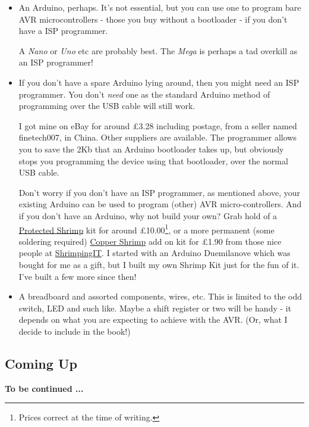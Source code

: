 \begin{itemize}
\item
  An Arduino, perhaps. It's not essential, but you can use one to program bare AVR microcontrollers - those you buy without a bootloader -   if you don't have a ISP programmer.
  
  A \emph{Nano} or \emph{Uno} etc are probably best. The \emph{Mega} is perhaps a tad overkill as an ISP programmer!
\item
  If you don't have a spare Arduino lying around, then you might need an ISP programmer. You don't \emph{need} one as the standard Arduino method of programming over the USB cable will still work.
  
  I got mine on eBay for around £3.28 including postage, from a seller named finetech007, in China. Other suppliers are available. The programmer allows you to save the 2Kb that an Arduino bootloader takes up, but obviously stops you programming the device using that bootloader, over the normal USB cable.

  Don't worry if you don't have an ISP programmer, as mentioned above, your existing Arduino can be used to program (other) AVR   micro-controllers. And if you don't have an Arduino, why not build your own? Grab hold of a \href{http://start.shrimping.it/project/protected/build.html}{Protected Shrimp} kit for around £10.00\footnote{Prices correct at the time of writing.}, or a more permanent (some soldering required) \href{http://start.shrimping.it/kit/stripboard.html}{Copper Shrimp} add on kit for £1.90 from those nice people at \href{http://start.shrimping.it//index.html}{ShrimpingIT}. I started with an Arduino Duemilanove which was bought for me as a gift, but I built my own Shrimp Kit just for the fun of it. I've built a few more since then!
\item
  A breadboard and assorted components, wires, etc. This is limited to the odd switch, LED and such like. Maybe a shift register or two will be handy - it depends on what you are expecting to achieve with the   AVR. (Or, what I decide to include in the book!)
\end{itemize}

\subsection*{Coming Up}\label{coming-up}

\textbf{To be continued ...}
